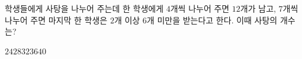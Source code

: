 학생들에게 사탕을 나누어 주는데 한 학생에게 $4$개씩 나누어 주면 $12$개가 남고, $7$개씩 나누어 주면 마지막 한 학생은 $2$개 이상 $6$개 미만을 받는다고 한다. 이때 사탕의 개수는?
\begin{choices32}{$24$}{$28$}{$32$}{$36$}{$40$}\end{choices32}
